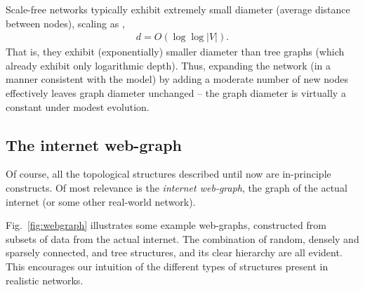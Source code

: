 Scale-free networks typically exhibit extremely small diameter (average distance between nodes), scaling as \cite{bib:PhysRevLett.90.058701},
\begin{align}
	d = O(\log \log |V|).
\end{align}
That is, they exhibit (exponentially) smaller diameter than tree graphs (which already exhibit only logarithmic depth). Thus, expanding the network (in a manner consistent with the model) by adding a moderate number of new nodes effectively leaves graph diameter unchanged -- the graph diameter is virtually a constant under modest evolution.

%
%

\subsection{The internet web-graph} 

Of course, all the topological structures described until now are in-principle constructs. Of most relevance is the \textit{internet web-graph}, the graph of the actual internet (or some other real-world network).

Fig.~\ref{fig:webgraph} illustrates some example web-graphs, constructed from subsets of data from the actual internet. The combination of random, densely and sparsely connected, and tree structures, and its clear hierarchy are all evident. This encourages our intuition of the different types of structures present in realistic networks.

